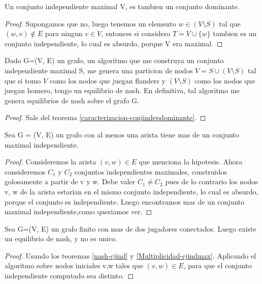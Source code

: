 \begin{theorem}
	Un conjunto independiente maximal V, es tambien un conjunto dominante.
\end{theorem}
\begin{proof}
	Supongamos que no, luego tenemos un elemento $w \in (V \setminus S)$ tal que $(w, v) \notin E$ para ningun $v \in V$, entonces si considero $T = V \cup \{w\}$ tambien es un conjunto independiente, lo cual es absurdo, porque V era maximal.
\end{proof}

\begin{theorem}
	\label{nash-cjind}
	Dado G=(V, E) un grafo, un algoritmo que me construya un conjunto independiente maximal S, me genera una particion de nodos $V = S \cup (V \setminus S)$ tal que si tomo $V$ como los nodos que juegan flanders y $(V\setminus S)$ como los nodos que juegan homero, tengo un equilibrio de nash. En definitiva, tal algoritmo me genera equilibrios de nash sobre el grafo G.
\end{theorem}
\begin{proof}
	Sale del teorema \ref{caracterizacion-conjindepdominante}.
\end{proof}

\begin{theorem}
	\label{Multiplicidad-cjindmax}
	Sea G = (V, E) un grafo con al menos una arista tiene mas de un conjunto maximal independiente.
\end{theorem}
\begin{proof}
	Consideremos la arista $(v, w)\in E$ que menciona la hipotesis. Ahora consideremos $C_1$ y $C_2$ conjuntos independientes maximales, construidos golosamente a partir de v y w. Debe valer $C_1 \neq C_2$ pues de lo contrario los nodos v, w de la arista estarian en el mismo conjunto independiente, lo cual es absurdo, porque el conjunto es independiente. Luego encontramos mas de un conjunto maximal independiente,como queriamos ver.  

\end{proof}
\begin{theorem}
	Sea G=(V, E) un grafo finito con mas de dos jugadores conectados. Luego existe un equilibrio de nash, y no es unico.
\end{theorem}
\begin{proof}
	Usando los teoremas \ref{nash-cjind} y \ref{Multiplicidad-cjindmax}. Aplicando el algoritmo sobre nodos iniciales v,w tales que $(v,w) \in E$, para que el conjunto independiente computado sea distinto.
\end{proof}

